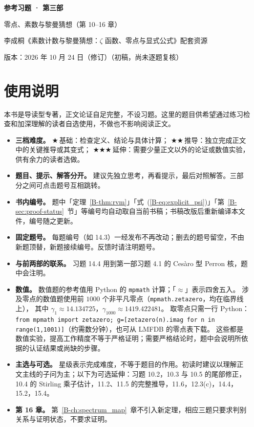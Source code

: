 \documentclass[11pt,a4paper]{article}
\newcommand{\bref}[1]{\ref*{B-#1}}
\newcommand{\lvI}{$\bigstar$\,基础}
\newcommand{\lvII}{$\bigstar\bigstar$\,推导}
\newcommand{\lvIII}{$\bigstar\bigstar\bigstar$\,延伸}
\newcommand{\versiondate}{2026 年 10 月 24 日（修订）}
\begin{document}
\begin{center}
{\LARGE\bfseries 参考习题 · 第三部\par}
\vspace{0.6em}
{\large 零点、素数与黎曼猜想（第 10–16 章）\par}
\vspace{0.6em}
{\normalsize 李成桐《素数计数与黎曼猜想：$\zeta$ 函数、零点与显式公式》配套资源\par}
\vspace{0.3em}
{\small 版本：\versiondate（初稿，尚未逐题复核）\par}
\end{center}

\vspace{0.8em}
\section*{使用说明}

本书是导读型专著，正文论证自足完整，不设习题。这里的题目供希望通过练习检查和加深理解的读者自选使用，不做也不影响阅读正文。

\begin{itemize}
  \item \textbf{三档难度。}
    \lvI：检查定义、结论与具体计算；
    \lvII：独立完成正文中的关键推导或其变式；
    \lvIII：需要少量正文以外的论证或数值实验，供有余力的读者选做。
  \item \textbf{题目、提示、解答分开。}
    建议先独立思考，再看提示，最后对照解答。三部分之间可点击题号互相跳转。
  \item \textbf{书内编号。}
    题中「定理~\bref{thm:rvm}」「式~(\bref{eq:explicit_psi})」「第~\bref{sec:proof-status}~节」等编号均自动取自当前书稿；书稿改版后重新编译本文件，编号随之更新。
  \item \textbf{固定题号。}
    每题编号（如 14.3）一经发布不再改动；删去的题号留空，不由新题顶替，新题接续编号。反馈时请注明题号。
  \item \textbf{与前两部的联系。}
    习题 14.4 用到第一部习题 4.1 的 Cesàro 型 Perron 核，题中会注明。
  \item \textbf{数值。}
    数值题的参考值用 Python 的 \texttt{mpmath} 计算；「$\approx$」表示四舍五入。
    涉及零点的数值题使用前 $1000$ 个非平凡零点（\texttt{mpmath.zetazero}，均在临界线上），
    其中 $\gamma_1\approx14.134725$，$\gamma_{1000}\approx1419.422481$。
    取零点只需一行 Python：\texttt{from mpmath import zetazero; g=[zetazero(n).imag for n in range(1,1001)]}（约需数分钟），也可从 LMFDB 的零点表下载。
    这些都是数值实验，提高工作精度不等于严格证明；需要严格结论时，题中会说明所依据的认证结果或尚缺的步骤。
  \item \textbf{主选与可选。}
    星级表示完成难度，不等于题目的作用。初读时建议以理解正文主线的子问为主；以下为可选延伸：习题 10.2，10.3 与 10.5 的尾部修正，10.4 的 Stirling 乘子估计，11.2、11.5 的完整推导，11.6，12.3(c)，14.4，15.2，15.4。
  \item \textbf{第 16 章。}
    第~\bref{ch:spectrum_map}~章不引入新定理，相应三题只要求判别关系与证明状态，不要求证明。
\end{itemize}
\end{document}
